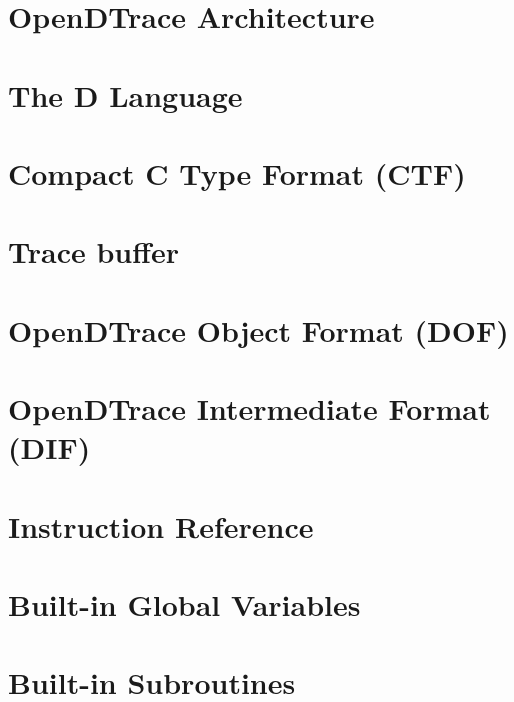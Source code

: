 \chapter{OpenDTrace Architecture}
\label{chap:opendtrace-arch}


\chapter{The D Language}
\label{chap:opendtrace-dlang}


\chapter{Compact C Type Format (CTF)}
\label{chap:opendtrace-ctf}


\chapter{Trace buffer}
\label{chap:opendtrace-trace-buffer}


\chapter{OpenDTrace Object Format (DOF)}
\label{chap:opendtrace-object-format}


\chapter{OpenDTrace Intermediate Format (DIF)}
\label{chap:opendtrace-intermediate-format}


\chapter{Instruction Reference}
\label{chap:opendtrace-instruction-reference}


\chapter{Built-in Global Variables}
\label{chap:opendtrace-global-vars}


\chapter{Built-in Subroutines}
\label{chap:opendtrace-subroutines}


